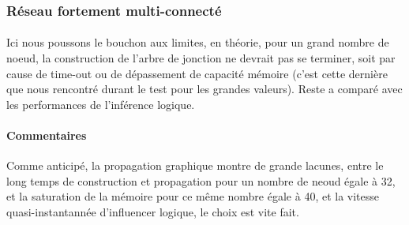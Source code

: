 \documentclass[]{report}
\begin{document}
	\subsubsection{Réseau fortement multi-connecté}
	\paragraph{}
	Ici nous poussons le bouchon aux limites, en théorie, pour un grand nombre de noeud, la construction de l'arbre de jonction
	ne devrait pas se terminer, soit par cause de time-out ou de dépassement de capacité mémoire (c'est cette dernière que nous
	rencontré durant le test pour les grandes valeurs). Reste a comparé avec les performances de l'inférence logique.


	\begin{table}[H]
	\centering
	\end{table}


	\paragraph{Commentaires}
	Comme anticipé, la propagation graphique montre de grande lacunes, entre le long temps de construction et propagation pour un 
	nombre de neoud égale à 32, et la saturation de la mémoire pour ce même nombre égale à 40, et la vitesse quasi-instantannée 
	d'influencer logique, le choix est vite fait.
\end{document}
